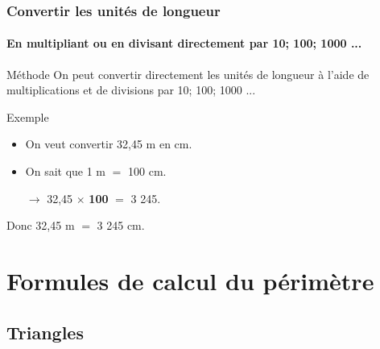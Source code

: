 \documentclass[xcolor=table]{beamer}
\begin{document}
\begin{frame}
	\frametitle{Convertir les unités de longueur}  
	\framesubtitle{En multipliant ou en divisant directement par 10; 100; 1000 ...}	
	
	\begin{alertblock}{Méthode}
		On peut convertir directement les unités de longueur à l'aide de multiplications et de divisions par 10; 100; 1000 ...
	\end{alertblock}\pause
	
	\begin{block}{Exemple}
		\begin{itemize}
			\item On veut convertir 32,45 m en cm.
			\item On sait que 1 m $=$ 100 cm.
			\item[$\rightarrow$] 32,45 $\times$ \textbf{100} $=$ 3 245.
		\end{itemize}
		
		Donc 32,45 m $=$ 3 245 cm.		
	\end{block}
	
\end{frame}

\section{Formules de calcul du périmètre}

\subsection{Triangles}
\end{document}
